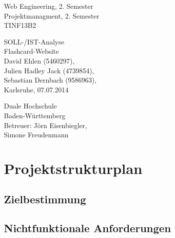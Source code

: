 \documentclass{article}
\newcommand{\appname}{Flashcard-Website}
\begin{document}
\begin{titlepage}
    \large
    \begin{flushleft}
        Web Engineering, 2. Semester \\
        Projektmanagment, 2. Semester \\
        TINF13B2
    \end{flushleft}
    
    \vfill

    \begin{center}
        \Huge SOLL-/IST-Analyse\\
        \Large \appname \\
        \vspace{1cm}
        \normalsize David Ehlen (5460297),\\
        Julien Hadley Jack (4739854), \\
        Sebastian Dernbach (9586963), \\
        \vspace\medskipamount
        \vspace\medskipamount
        Karlsruhe, 07.07.2014
    \end{center}
    
    \vfill
    
    \begin{flushright}
        Duale Hochschule \\
        Baden-Württemberg \\
        \vspace\medskipamount
        Betreuer: Jörn Eisenbiegler,\\
        Simone Freudenmann
    \end{flushright}
\end{titlepage}

\newpage

\pagestyle{empty}
\tableofcontents
\cleardoublepage

\setcounter{page}{1}
\pagestyle{plain}
\setcounter{page}{1}

\section{Projektstrukturplan}
\subsection{Zielbestimmung}
\subsection{Nichtfunktionale Anforderungen}
\end{document}
